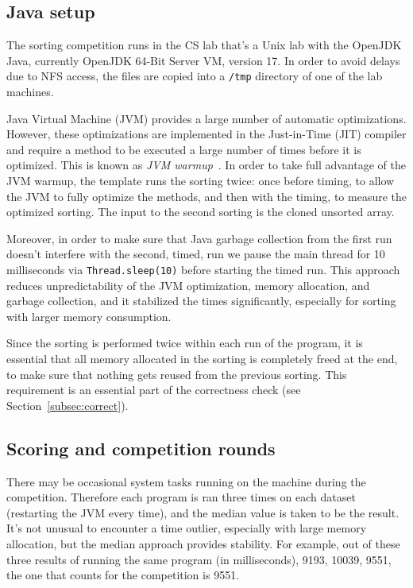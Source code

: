 \documentclass[12pt]{article}
\newcommand{\comment}[1]{}
\newcommand{\emcomment}[1]{\textcolor{ForestGreen}{\comment{Elena: {#1}}}}
\begin{document}
\subsection{Java setup}\label{subsec:java-setup}
The sorting competition runs in the CS lab that's a Unix lab with the OpenJDK Java, currently OpenJDK 64-Bit Server VM, version 17. In order to avoid delays due to NFS access, the files are copied into a \texttt{/tmp} directory of one of the lab machines. 

Java Virtual Machine (JVM) provides a large number of automatic optimizations.  However, these optimizations are implemented in the Just-in-Time (JIT) compiler and require a method to be executed a large number of times before it is optimized. This is known as \textit{JVM warmup}~\cite{warmup}. In order to take full advantage of the JVM warmup, the template runs the sorting twice: once before timing, to allow the JVM to fully optimize the methods, and then with the timing, to measure the optimized sorting. The input to the second sorting is the cloned unsorted array. 

Moreover, in order to make sure that Java garbage collection from the first run doesn't interfere with the second, timed, run we pause the main thread for 10 milliseconds via \texttt{Thread.sleep(10)} before starting the timed run. This approach reduces unpredictability of the JVM optimization, memory allocation, and garbage collection, and it stabilized the times significantly, especially for sorting with larger memory consumption. 

Since the sorting is performed twice within each run of the program, it is essential that all memory allocated in the sorting is completely freed at the end, to make sure that nothing gets reused from the previous sorting. This requirement is an essential part of the correctness check (see Section~\ref{subsec:correct}). 

\subsection{Scoring and competition rounds}\label{subsec:rounds}
There may be occasional system tasks running on the machine during the competition. Therefore each program is ran three times on each dataset (restarting the JVM every time), and the median value is taken to be the result. It's not unusual to encounter a time outlier, especially with large memory allocation, but the median approach provides stability. For example, out of these three results of running the same program (in milliseconds), 9193, 10039, 9551, the one that counts for the competition is 9551. 
\end{document}
